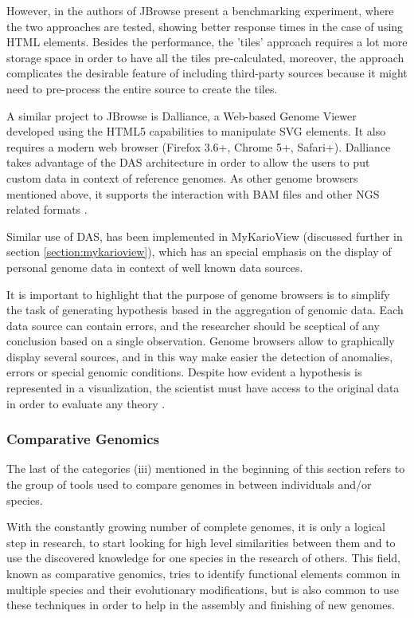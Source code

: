 However, in \cite{SKI2009} the authors of JBrowse present a benchmarking experiment, where the two approaches are tested, showing better response times in the case of using HTML elements. Besides the performance, the 'tiles' approach requires a lot more storage space in order to have all the tiles pre-calculated, moreover, the approach complicates the desirable feature of including third-party sources because it might need to pre-process the entire source to create the tiles.

A similar project to JBrowse is Dalliance, a Web-based Genome Viewer developed using the HTML5 capabilities to manipulate SVG elements. It also requires a modern web browser (Firefox 3.6+, Chrome 5+, Safari+). Dalliance takes advantage of the DAS architecture in order to allow the users to put custom data in context of reference genomes. As other genome browsers mentioned above, it supports the interaction with BAM files and other NGS related formats \cite{DOW2011}. 

Similar use of DAS, has been implemented in MyKarioView (discussed further in section \ref{section:mykarioview}), which has an special emphasis on the display of personal genome data in context of well known data sources.

It is important to highlight that the purpose of genome browsers is to simplify the task of generating hypothesis based in the aggregation of genomic data. Each data source can contain errors, and the researcher should be sceptical of any conclusion based on a single observation. Genome browsers allow to graphically display several sources, and in this way make easier the detection of anomalies, errors or special genomic conditions. Despite how evident a hypothesis is represented in a visualization, the scientist must have access to the original data in order to evaluate any theory \cite{CLI2009}.

\subsubsection{Comparative Genomics}
The last of the categories (iii) mentioned in the beginning of this section refers to the group of tools used to compare genomes in between individuals and/or species.

With the constantly growing number of complete genomes, it is only a logical step in research, to start looking for high level similarities between them and to use the discovered knowledge for one species in the research of others. This field, known as comparative genomics, tries to identify functional elements common in multiple species and their evolutionary modifications, but is also common to use these techniques in order to help in the assembly and finishing of new genomes.

